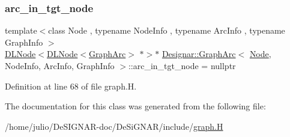 \subsubsection{\texorpdfstring{arc\+\_\+in\+\_\+tgt\+\_\+node}{arc\_in\_tgt\_node}}
{\footnotesize\ttfamily template$<$class Node , typename Node\+Info , typename Arc\+Info , typename Graph\+Info $>$ \\
\hyperlink{class_designar_1_1_d_l_node}{D\+L\+Node}$<$\hyperlink{class_designar_1_1_d_l_node}{D\+L\+Node}$<$\hyperlink{class_designar_1_1_graph_arc}{Graph\+Arc}$>$ $\ast$$>$$\ast$ \hyperlink{class_designar_1_1_graph_arc}{Designar\+::\+Graph\+Arc}$<$ \hyperlink{namespace_designar_a5af326c65aa2bd26b26c410f2030d09e}{Node}, Node\+Info, Arc\+Info, Graph\+Info $>$\+::arc\+\_\+in\+\_\+tgt\+\_\+node = nullptr\hspace{0.3cm}{\ttfamily [protected]}}



Definition at line 68 of file graph.\+H.



The documentation for this class was generated from the following file\+:\begin{DoxyCompactItemize}
\item 
/home/julio/\+De\+S\+I\+G\+N\+A\+R-\/doc/\+De\+Si\+G\+N\+A\+R/include/\hyperlink{graph_8_h}{graph.\+H}\end{DoxyCompactItemize}
